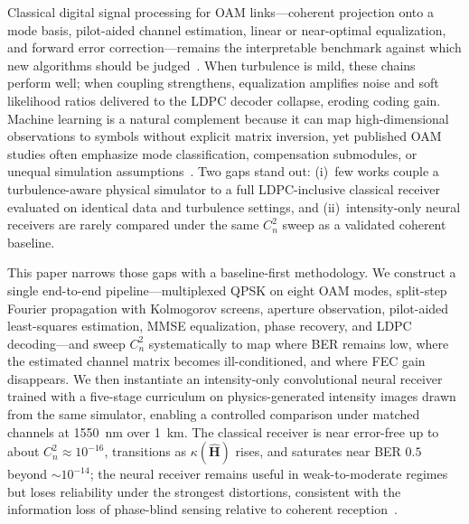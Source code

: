 \documentclass[journal]{IEEEtran}
\begin{document}
Classical digital signal processing for OAM links---coherent projection onto a mode basis, pilot-aided channel estimation, linear or near-optimal equalization, and forward error correction---remains the interpretable benchmark against which new algorithms should be judged~\cite{huang2014100, ge2021oam}. When turbulence is mild, these chains perform well; when coupling strengthens, equalization amplifies noise and soft likelihood ratios delivered to the LDPC decoder collapse, eroding coding gain. Machine learning is a natural complement because it can map high-dimensional observations to symbols without explicit matrix inversion, yet published OAM studies often emphasize mode classification, compensation submodules, or unequal simulation assumptions~\cite{liu2019oam_prl, doster2017machine, karanov2018endtoend, zhao2020cnn, lohani2018turbulence, arya2023oam}. Two gaps stand out: (i)~few works couple a turbulence-aware physical simulator to a full LDPC-inclusive classical receiver evaluated on identical data and turbulence settings, and (ii)~intensity-only neural receivers are rarely compared under the same $C_n^2$ sweep as a validated coherent baseline.

This paper narrows those gaps with a baseline-first methodology. We construct a single end-to-end pipeline---multiplexed QPSK on eight OAM modes, split-step Fourier propagation with Kolmogorov screens, aperture observation, pilot-aided least-squares estimation, MMSE equalization, phase recovery, and LDPC decoding---and sweep $C_n^2$ systematically to map where BER remains low, where the estimated channel matrix becomes ill-conditioned, and where FEC gain disappears. We then instantiate an intensity-only convolutional neural receiver trained with a five-stage curriculum on physics-generated intensity images drawn from the same simulator, enabling a controlled comparison under matched channels at 1550~nm over 1~km. The classical receiver is near error-free up to about $C_n^2 \approx 10^{-16}$, transitions as $\kappa(\hat{\mathbf{H}})$ rises, and saturates near BER $0.5$ beyond $\sim 10^{-14}$; the neural receiver remains useful in weak-to-moderate regimes but loses reliability under the strongest distortions, consistent with the information loss of phase-blind sensing relative to coherent reception~\cite{ren2013atmospheric}.
\end{document}
